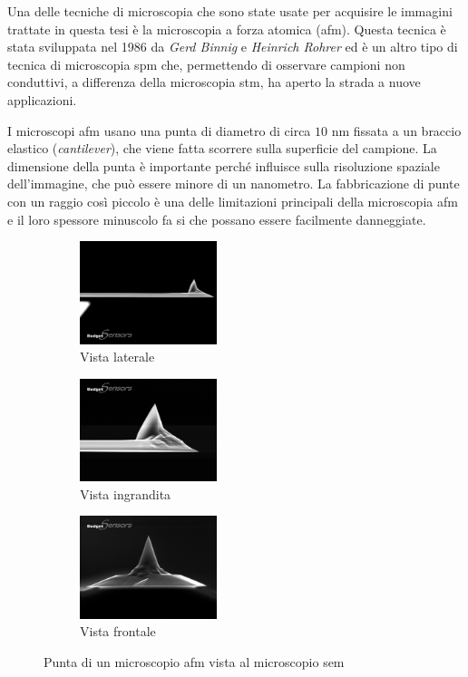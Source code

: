 \documentclass[../main.tex]{subfiles}
\begin{document}
Una delle tecniche di microscopia che sono state usate per acquisire le immagini trattate in questa tesi è la microscopia a forza atomica (\acrshort{afm}). Questa tecnica è stata sviluppata nel 1986 da \textit{Gerd Binnig} e \textit{Heinrich Rohrer} ed è un altro tipo di tecnica di microscopia \acrshort{spm} che, permettendo di osservare campioni non conduttivi, a differenza della microscopia \acrshort{stm}, ha aperto la strada a nuove applicazioni.\cite{binnig_1986}

I microscopi \acrshort{afm} usano una punta di diametro di circa $10$ nm fissata a un braccio elastico (\textit{cantilever}), che viene fatta scorrere sulla superficie del campione. La dimensione della punta è importante perché influisce sulla risoluzione spaziale dell'immagine, che può essere minore di un nanometro. La fabbricazione di punte con un raggio così piccolo è una delle limitazioni principali della microscopia \acrshort{afm} e il loro spessore minuscolo fa si che possano essere facilmente danneggiate.\\

\begin{figure}[H]
	\centering
	\begin{subfigure}{4cm}
		\includegraphics[width=4cm]{images/afm_tip.png}
		\caption{Vista laterale}
	\end{subfigure}
	\hfill
	\begin{subfigure}{4cm}
		\includegraphics[width=4cm]{images/afm_tip_zoom.png}
		\caption{Vista ingrandita}
	\end{subfigure}
	\hfill
	\begin{subfigure}{4cm}
		\includegraphics[width=4cm]{images/afm_tip_front.png}
		\caption{Vista frontale}
	\end{subfigure}
\caption[Punta di un microscopio AFM vista al microscopio SEM]{
	Punta di un microscopio \acrshort{afm} vista al microscopio \acrshort{sem}\ \cite{budgetsensors} }
\label{fig:afm_tip}
\end{figure}
\end{document}

